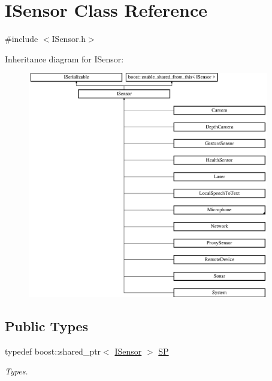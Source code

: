 \hypertarget{class_i_sensor}{}\section{I\+Sensor Class Reference}
\label{class_i_sensor}


{\ttfamily \#include $<$I\+Sensor.\+h$>$}

Inheritance diagram for I\+Sensor\+:\begin{figure}[H]
\begin{center}
\leavevmode
\includegraphics[height=9.861635cm]{class_i_sensor}
\end{center}
\end{figure}
\subsection*{Public Types}
\begin{DoxyCompactItemize}
\item 
\mbox{\label{class_i_sensor_a9c8b231fdda50c9d368e47ef5b9d0faf}} 
typedef boost\+::shared\+\_\+ptr$<$ \hyperlink{class_i_sensor}{I\+Sensor} $>$ \hyperlink{class_i_sensor_a9c8b231fdda50c9d368e47ef5b9d0faf}{SP}
\begin{DoxyCompactList}\small\item\em Types. \end{DoxyCompactList}\end{DoxyCompactItemize}
